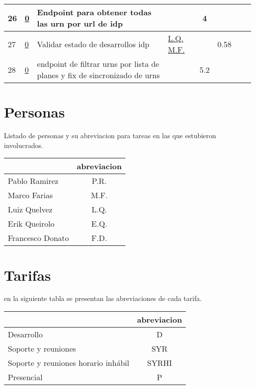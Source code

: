 \documentclass{article}
\begin{document}
\begin{longtable}{|m{0.5cm}|m{1.2cm}|p{6cm}|m{1.5cm}||c|c|c|c||}
                 \label{26}26  &  \hyperref[0]{\color{blue}0}  & Endpoint para obtener todas las urn por url de idp &  
                 & 4 &  &  & \\ \hline 

                 \label{27}27  &  \hyperref[0]{\color{blue}0}  & Validar estado de desarrollos idp &  
                  \hyperref[L.Q.]{\color{blue}L.Q.} \newline  \hyperref[M.F.]{\color{blue}M.F.}  &  & 0.58 &  & \\ \hline 

                 \label{28}28  &  \hyperref[0]{\color{blue}0}  & endpoint de filtrar urns por lista de planes y fix de sincronizado de urns &  
                 & 5.2 &  &  & \\ \hline 

    \end{longtable} 
 \newpage
\section{Personas}
Listado de personas y su abreviacion para tareas en las que estubieron involucrados.
\begin{table}[htbp]
    \centering
    \begin{tabular}{|p{6cm}|c|}
        \hline
        \centering{\textbf{Nombre}} & \textbf{abreviacion} \\ \hline
        Pablo Ramirez &  \label{P.R.}P.R.  \\ \hline
        Marco Farias &  \label{M.F.}M.F.  \\ \hline
        Luiz Quelvez &  \label{L.Q.}L.Q.  \\ \hline
        Erik Queirolo &  \label{E.Q.}E.Q.  \\ \hline
        Francesco Donato &  \label{F.D.}F.D.  \\ \hline
    \end{tabular}
\end{table} 
 
\section{Tarifas}
    en la siguiente tabla se presentan las abreviaciones de cada tarifa.
\begin{table}[htbp]
    \centering
    \begin{tabular}{|p{6cm}|c|}
        \hline
        \centering{\textbf{Nombre}} & \textbf{abreviacion} \\ \hline  Desarrollo &  \label{D}D  \\ \hline 
 Soporte y reuniones &  \label{SYR}SYR  \\ \hline 
 Soporte y reuniones horario inhábil &  \label{SYRHI}SYRHI  \\ \hline 
 Presencial &  \label{P}P  \\ \hline 

    \end{tabular}
\end{table} 
 
\end{document}
